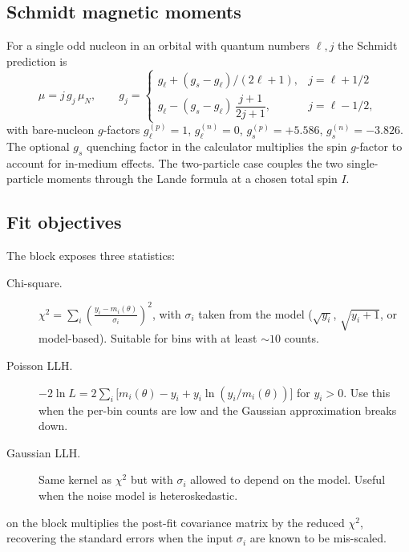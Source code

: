 \subsection{Schmidt magnetic moments}

For a single odd nucleon in an orbital with quantum numbers
$\ell, j$ the Schmidt prediction is
\begin{equation}
    \mu = j\,g_j\,\mu_N, \qquad
    g_j = \begin{cases}
        g_\ell + (g_s - g_\ell)/(2\ell+1), & j = \ell + 1/2 \\
        g_\ell - (g_s - g_\ell)\,\dfrac{j+1}{2j+1}, & j = \ell - 1/2,
    \end{cases}
\end{equation}
with bare-nucleon $g$-factors $g_\ell^{(p)} = 1$, $g_\ell^{(n)} = 0$,
$g_s^{(p)} = +5.586$, $g_s^{(n)} = -3.826$. The optional $g_s$
quenching factor in the calculator multiplies the spin $g$-factor to
account for in-medium effects. The two-particle case couples the
two single-particle moments through the Lande formula at a chosen
total spin $I$.

\subsection{Fit objectives}

The  block exposes three statistics:

\begin{description}
    \item[Chi-square.]
        $\chi^2 = \sum_i \left(\frac{y_i - m_i(\theta)}{\sigma_i}\right)^2$,
        with $\sigma_i$ taken from the  model
        ($\sqrt{y_i}$, $\sqrt{y_i+1}$, or model-based). Suitable for
        bins with at least $\sim 10$ counts.
    \item[Poisson LLH.]
        $-2 \ln L = 2 \sum_i \big[m_i(\theta) - y_i + y_i \ln(y_i/m_i(\theta))\big]$
        for $y_i > 0$. Use this when the per-bin counts are low and
        the Gaussian approximation breaks down.
    \item[Gaussian LLH.]
        Same kernel as $\chi^2$ but with $\sigma_i$ allowed to depend
        on the model. Useful when the noise model is heteroskedastic.
\end{description}

 on the  block multiplies the
post-fit covariance matrix by the reduced $\chi^2$, recovering the
standard errors when the input $\sigma_i$ are known to be
mis-scaled.


